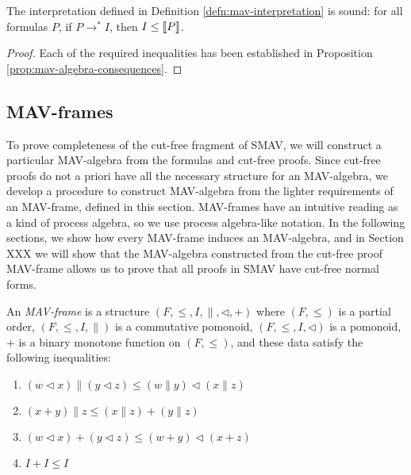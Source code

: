 \begin{theorem}\label{thm:soundness}
  The interpretation defined in Definition
  \ref{defn:mav-interpretation} is sound: for all formulas $P$, if
  $P \longrightarrow^* I$, then $I \leq \llbracket P \rrbracket$.
\end{theorem}

\begin{proof}
  Each of the required inequalities has been established in
  Proposition \ref{prop:mav-algebra-consequences}.
\end{proof}

\subsection{MAV-frames}

To prove completeness of the cut-free fragment of SMAV, we will
construct a particular MAV-algebra from the formulas and cut-free
proofs. Since cut-free proofs do not a priori have all the necessary
structure for an MAV-algebra, we develop a procedure to construct
MAV-algebra from the lighter requirements of an MAV-frame, defined in
this section. MAV-frames have an intuitive reading as a kind of
process algebra, so we use process algebra-like notation. In the
following sections, we show how every MAV-frame induces an
MAV-algebra, and in Section XXX we will show that the MAV-algebra
constructed from the cut-free proof MAV-frame allows us to prove that
all proofs in SMAV have cut-free normal forms.

\begin{definition}
  An \emph{MAV-frame} is a structure
  $(F, \leq, I, \parallel, \lhd, +)$ where $(F, \leq)$ is a partial
  order, $(F, \leq, I, \parallel)$ is a commutative pomonoid,
  $(F, \leq, I, \lhd)$ is a pomonoid, $+$ is a binary monotone
  function on $(F, \leq)$, and these data satisfy the following
  inequalities:
  \begin{enumerate}
    \item $(w \lhd x) \parallel (y \lhd z) \leq (w \parallel y) \lhd (x \parallel z)$
    \item $(x + y) \parallel z \leq (x \parallel z) + (y \parallel z)$
    \item $(w \lhd x) + (y \lhd z) \leq (w + y) \lhd (x + z)$
    \item $I + I \leq I$
  \end{enumerate}
\end{definition}

\begin{remark}
\end{remark}

